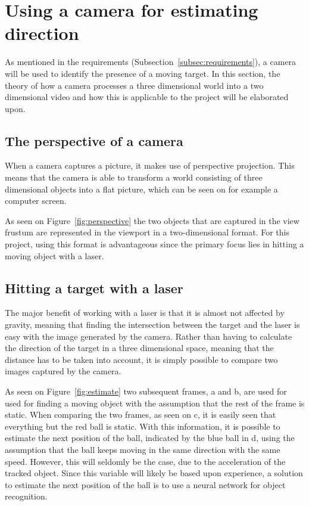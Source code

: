 \section{Using a camera for estimating direction}
As mentioned in the requirements (Subsection~\ref{subsec:requirements}), a camera will be used to identify the presence of a moving target.
In this section, the theory of how a camera processes a three dimensional world into a two dimensional video and how this is applicable to the project will be elaborated upon.

\subsection{The perspective of a camera}
When a camera captures a picture, it makes use of perspective projection.
This means that the camera is able to transform a world consisting of three dimensional objects into a flat picture, which can be seen on for example a computer screen.


As seen on Figure~\ref{fig:perspective} the two objects that are captured in the view frustum are represented in the viewport in a two-dimensional format.
For this project, using this format is advantageous since the primary focus lies in hitting a moving object with a laser.

\subsection{Hitting a target with a laser}
The major benefit of working with a laser is that it is almost not affected by gravity, meaning that finding the intersection between the target and the laser is easy with the image generated by the camera.
Rather than having to calculate the direction of the target in a three dimensional space, meaning that the distance has to be taken into account, it is simply possible to compare two images captured by the camera.

As seen on Figure~\ref{fig:estimate} two subsequent frames, a and b, are used for used for finding a moving object with the assumption that the rest of the frame is static. 
When comparing the two frames, as seen on c, it is easily seen that everything but the red ball is static.
With this information, it is possible to estimate the next position of the ball, indicated by the blue ball in d, using the assumption that the ball keeps moving in the same direction with the same speed.
However, this will seldomly be the case, due to the acceleration of the tracked object.
Since this variable will likely be based upon experience, a solution to estimate the next position of the ball is to use a neural network for object recognition.